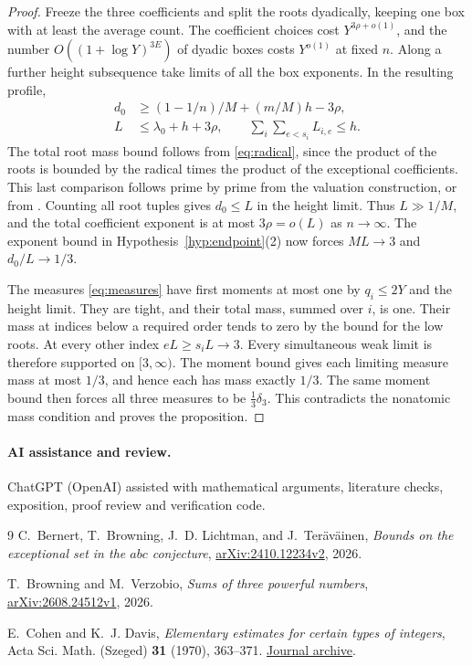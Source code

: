 \documentclass[11pt,reqno]{amsart}
\begin{document}
\begin{proof}
Freeze the three coefficients and split the roots dyadically, keeping
one box with at least the average count. The coefficient choices cost
\(Y^{3\rho+o(1)}\), and the number \(O((1+\log Y)^{3E})\) of dyadic
boxes costs \(Y^{o(1)}\) at fixed \(n\). Along a further height
subsequence take limits of all the box exponents. In the resulting
profile,
\begin{align*}
 d_0&\ge (1-1/n)/M+(m/M)h-3\rho,\\
 L&\le\lambda_0+h+3\rho,\qquad \sum_i\sum_{e<s_i} L_{i,e}\le h.
\end{align*}
The total root mass bound follows from \eqref{eq:radical}, since the
product of the roots is bounded by the radical times the product of the
exceptional coefficients. This last comparison follows prime by prime
from the valuation construction, or from \cite[Lemma~2.2]{BBLT}.
Counting all root tuples gives \(d_0\le L\) in the height limit. Thus
\(L\gg1/M\), and the total coefficient exponent is at most
\(3\rho=o(L)\) as \(n\to\infty\). The exponent bound
in Hypothesis~\ref{hyp:endpoint}(2) now forces \(ML\to3\) and
\(d_0/L\to1/3\).

The measures \eqref{eq:measures} have first moments at most one
by \(q_i\le2Y\) and the height limit. They are tight,
and their total mass, summed over \(i\), is one. Their mass at indices
below a required order tends to zero by the bound for the low roots.
At every other index \(eL\ge s_i L\to3\). Every simultaneous weak
limit is therefore supported on \([3,\infty)\). The moment bound
gives each limiting measure mass at most \(1/3\), and hence each has
mass exactly \(1/3\). The same moment bound then forces all three
measures to be \(\tfrac13\delta_3\). This contradicts the nonatomic
mass condition and proves the proposition.
\end{proof}

\paragraph{AI assistance and review.}
ChatGPT (OpenAI) assisted with mathematical arguments, literature checks,
exposition, proof review and verification code.

\begin{thebibliography}{9}
C.~Bernert, T.~Browning, J.~D. Lichtman, and J.~Ter\"av\"ainen,
\emph{Bounds on the exceptional set in the \(abc\) conjecture},
\href{https://arxiv.org/abs/2410.12234v2}{arXiv:2410.12234v2}, 2026.

T.~Browning and M.~Verzobio, \emph{Sums of three powerful numbers},
\href{https://arxiv.org/abs/2608.24512v1}{arXiv:2608.24512v1}, 2026.

E.~Cohen and K.~J. Davis, \emph{Elementary estimates for certain types of
integers}, Acta Sci. Math. (Szeged) \textbf{31} (1970), 363--371.
\href{https://acta.bibl.u-szeged.hu/14284/1/math_031_fasc_003_004_363-371.pdf}{Journal archive}.
\end{thebibliography}
\end{document}
